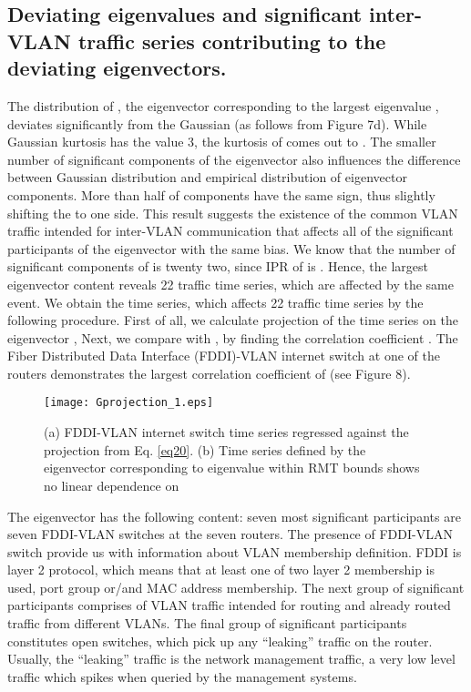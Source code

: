 \documentclass{IEEEtran}
\begin{document}
\subsection{Deviating eigenvalues and significant inter-VLAN traffic series contributing
to the deviating eigenvectors.}

The distribution of , the eigenvector corresponding to the
largest eigenvalue , deviates significantly from the
Gaussian (as follows from Figure 7d). While Gaussian kurtosis has
the value 3, the kurtosis of  comes out to
. The smaller number of significant components of the eigenvector
also influences the difference between Gaussian distribution and empirical
distribution of eigenvector components. More than half of components
have the same sign, thus slightly shifting the 
to one side. This result suggests the existence of the common VLAN
traffic intended for inter-VLAN communication that affects all of
the significant participants of the eigenvector with the
same bias. We know that the number of significant components of 
is twenty two, since IPR of is . Hence, the largest
eigenvector content reveals 22 traffic time series, which are affected
by the same event. We obtain the time series, which affects 22 traffic
time series by the following procedure. First of all, we calculate
projection  of the time series 
on the eigenvector ,
Next, we compare  with ,
by finding the correlation coefficient .
The Fiber Distributed Data Interface (FDDI)-VLAN internet switch at
one of the routers demonstrates the largest correlation coefficient
of  (see Figure 8).\begin{figure}[h]
\begin{center}\texttt{[image: Gprojection\_1.eps]}\end{center}


\caption{\label{8} (a) FDDI-VLAN internet switch time series regressed against
the projection  from Eq. \ref{eq20}. (b)
Time series defined by the eigenvector corresponding to eigenvalue
within RMT bounds shows no linear dependence on }
\end{figure}
The eigenvector  has the following content: seven most significant
participants are seven FDDI-VLAN switches at the seven routers. The
presence of FDDI-VLAN switch provide us with information about VLAN
membership definition. FDDI is layer 2 protocol, which means that
at least one of two layer 2 membership is used, port group or/and
MAC address membership. The next group of significant participants
comprises of VLAN traffic intended for routing and already routed
traffic from different VLANs. The final group of significant participants
constitutes open switches, which pick up any {}``leaking'' traffic
on the router. Usually, the {}``leaking'' traffic is the network
management traffic, a very low level traffic which spikes when queried
by the management systems.
\end{document}
